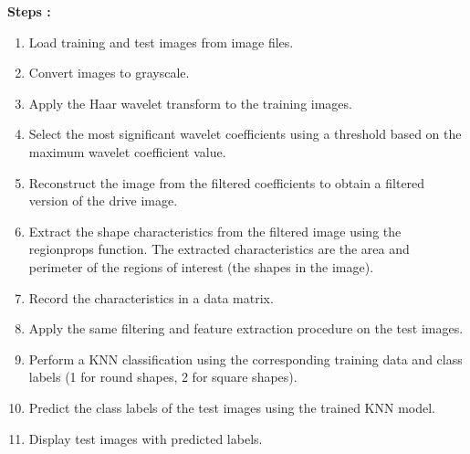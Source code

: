 \textbf{Steps :} 
\begin{enumerate}
\item Load training and test images from image files.
\item Convert images to grayscale.
\item Apply the Haar wavelet transform to the training images.
\item Select the most significant wavelet coefficients using a threshold based on the maximum wavelet coefficient value.
\item Reconstruct the image from the filtered coefficients to obtain a filtered version of the drive image.
\item Extract the shape characteristics from the filtered image using the regionprops function. The extracted characteristics are the area and perimeter of the regions of interest (the shapes in the image).
\item Record the characteristics in a data matrix.
\item Apply the same filtering and feature extraction procedure on the test images.
\item Perform a KNN classification using the corresponding training data and class labels (1 for round shapes, 2 for square shapes).
\item Predict the class labels of the test images using the trained KNN model.
\item Display test images with predicted labels.

\end{enumerate}
